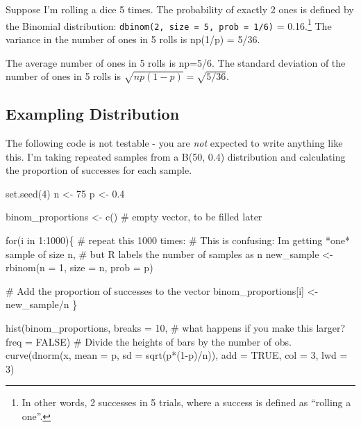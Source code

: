 \documentclass[
  letterpaper,
  DIV=11,
  numbers=noendperiod]{scrreprt}
\newenvironment{Shaded}{\begin{snugshade}}{\end{snugshade}}
\newcommand{\AttributeTok}[1]{\textcolor[rgb]{0.40,0.45,0.13}{#1}}
\newcommand{\CommentTok}[1]{\textcolor[rgb]{0.37,0.37,0.37}{#1}}
\newcommand{\ConstantTok}[1]{\textcolor[rgb]{0.56,0.35,0.01}{#1}}
\newcommand{\ControlFlowTok}[1]{\textcolor[rgb]{0.00,0.23,0.31}{#1}}
\newcommand{\DecValTok}[1]{\textcolor[rgb]{0.68,0.00,0.00}{#1}}
\newcommand{\FloatTok}[1]{\textcolor[rgb]{0.68,0.00,0.00}{#1}}
\newcommand{\FunctionTok}[1]{\textcolor[rgb]{0.28,0.35,0.67}{#1}}
\newcommand{\NormalTok}[1]{\textcolor[rgb]{0.00,0.23,0.31}{#1}}
\newcommand{\OtherTok}[1]{\textcolor[rgb]{0.00,0.23,0.31}{#1}}
\newcommand{\SpecialCharTok}[1]{\textcolor[rgb]{0.37,0.37,0.37}{#1}}
\begin{document}
Suppose I'm rolling a dice 5 times. The probability of exactly 2 ones is
defined by the Binomial distribution:
\texttt{dbinom(2,\ size\ =\ 5,\ prob\ =\ 1/6)} = 0.16.\footnote{In other
  words, 2 successes in 5 trials, where a success is defined as
  ``rolling a one''.} The variance in the number of ones in 5 rolls is
np(1/p) = 5/36.

The average number of ones in 5 rolls is np=5/6. The standard deviation
of the number of ones in 5 rolls is \(\sqrt{np(1-p)} = \sqrt{5/36}\).

\hypertarget{exampling-distribution}{%
\subsection{Exampling Distribution}\label{exampling-distribution}}

The following code is not testable - you are \emph{not} expected to
write anything like this. I'm taking repeated samples from a B(50, 0.4)
distribution and calculating the proportion of successes for each
sample.

\begin{Shaded}
\begin{Highlighting}[]
\FunctionTok{set.seed}\NormalTok{(}\DecValTok{4}\NormalTok{)}
\NormalTok{n }\OtherTok{\textless{}{-}} \DecValTok{75}
\NormalTok{p }\OtherTok{\textless{}{-}} \FloatTok{0.4}

\NormalTok{binom\_proportions }\OtherTok{\textless{}{-}} \FunctionTok{c}\NormalTok{() }\CommentTok{\# empty vector, to be filled later}

\ControlFlowTok{for}\NormalTok{(i }\ControlFlowTok{in} \DecValTok{1}\SpecialCharTok{:}\DecValTok{1000}\NormalTok{)\{ }\CommentTok{\# repeat this 1000 times:}
    \CommentTok{\# This is confusing: I\textquotesingle{}m getting *one* sample of size n,}
    \CommentTok{\# but R labels the number of samples as n}
\NormalTok{    new\_sample }\OtherTok{\textless{}{-}} \FunctionTok{rbinom}\NormalTok{(}\AttributeTok{n =} \DecValTok{1}\NormalTok{, }\AttributeTok{size =}\NormalTok{ n, }\AttributeTok{prob =}\NormalTok{ p)}
    
    \CommentTok{\# Add the proportion of successes to the vector}
\NormalTok{    binom\_proportions[i] }\OtherTok{\textless{}{-}}\NormalTok{ new\_sample}\SpecialCharTok{/}\NormalTok{n}
\NormalTok{\}}

\FunctionTok{hist}\NormalTok{(binom\_proportions, }
    \AttributeTok{breaks =} \DecValTok{10}\NormalTok{, }\CommentTok{\# what happens if you make this larger?}
    \AttributeTok{freq =} \ConstantTok{FALSE}\NormalTok{) }\CommentTok{\# Divide the heights of bars by the number of obs.}
\FunctionTok{curve}\NormalTok{(}\FunctionTok{dnorm}\NormalTok{(x, }\AttributeTok{mean =}\NormalTok{ p, }\AttributeTok{sd =} \FunctionTok{sqrt}\NormalTok{(p}\SpecialCharTok{*}\NormalTok{(}\DecValTok{1}\SpecialCharTok{{-}}\NormalTok{p)}\SpecialCharTok{/}\NormalTok{n)), }\AttributeTok{add =} \ConstantTok{TRUE}\NormalTok{, }\AttributeTok{col =} \DecValTok{3}\NormalTok{, }\AttributeTok{lwd =} \DecValTok{3}\NormalTok{)}
\end{Highlighting}
\end{Shaded}
\end{document}
